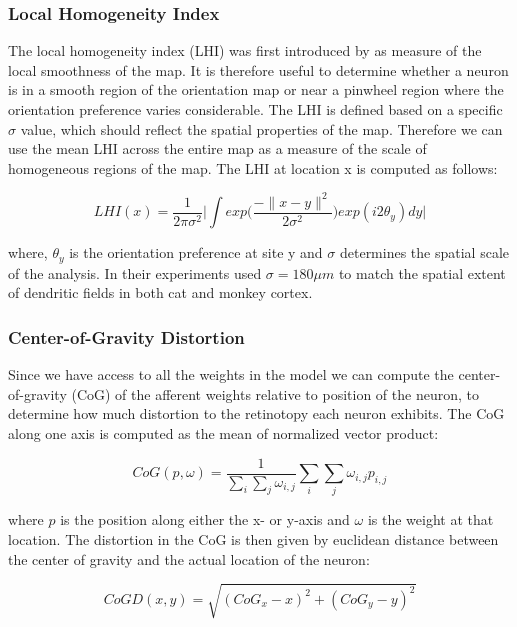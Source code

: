 \subsubsection{Local Homogeneity Index}

The local homogeneity index (LHI) was first introduced by
\cite{Nauhaus2008} as measure of the local smoothness of the map. It
is therefore useful to determine whether a neuron is in a smooth
region of the orientation map or near a pinwheel region where the
orientation preference varies considerable. The LHI is defined based
on a specific $\sigma$ value, which should reflect the spatial
properties of the map. Therefore we can use the mean LHI across the
entire map as a measure of the scale of homogeneous regions of the
map. The LHI at location x is computed as follows:

\begin{equation}
  LHI(x) = \frac{1}{2\pi \sigma^2} \bigg\lvert \int
  exp\bigg(\frac{-\|x-y\|^2}{2\sigma^2}\bigg) exp(i2\theta_y) dy
  \bigg\rvert
\end{equation}

where, $\theta_y$ is the orientation preference at site y and $\sigma$
determines the spatial scale of the analysis. In their experiments
\cite{Nauhaus2008} used $\sigma=180\mu m$ to match the spatial extent
of dendritic fields in both cat and monkey cortex.

\subsubsection{Center-of-Gravity Distortion}

Since we have access to all the weights in the model we can compute
the center-of-gravity (CoG) of the afferent weights relative to
position of the neuron, to determine how much distortion to the
retinotopy each neuron exhibits. The CoG along one axis is computed as
the mean of normalized vector product:

\begin{equation}
  CoG(p, \omega) = \frac{1}{\sum_i \sum_j \omega_{i, j}} \sum_i \sum_j \omega_{i,j} p_{i,j}  
\end{equation}

where $p$ is the position along either the x- or y-axis and $\omega$
is the weight at that location. The distortion in the CoG is then
given by euclidean distance between the center of gravity and the
actual location of the neuron:

\begin{equation}
  CoGD(x, y) = \sqrt{(CoG_x-x)^2 + (CoG_y-y)^2}
\end{equation}


